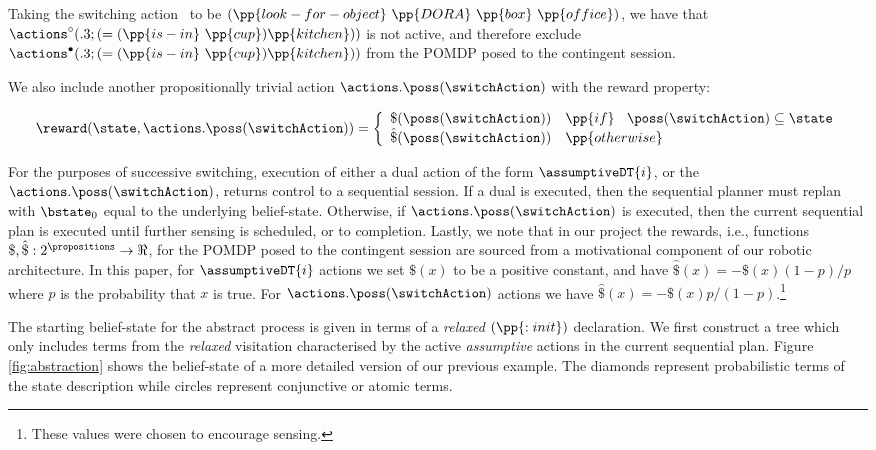 \noindent Taking the switching action \switchAction\ to be
$(\pp{look-for-object}~\pp{DORA}~\pp{box}~\pp{office})$, we have that
$\actions^{\circ}(.3;(=(\pp{is-in}~\pp{cup})\pp{kitchen}))$ is not
active, and therefore exclude
$\actions^{\bullet}(.3;(=(\pp{is-in}~\pp{cup})\pp{kitchen}))$ from the
POMDP posed to the contingent session. 

We also include another propositionally trivial action
$\actions.\poss(\switchAction)$ with the reward property:

\[
\reward(\state, \actions.\poss(\switchAction)) = \bigg\{ \begin{array}{ll}
\$(\poss(\switchAction)) & \pp{if}~\;\; \poss(\switchAction) \subseteq \state \\
\hat\$(\poss(\switchAction)) & \pp{otherwise} \\
\end{array}
\]

For the purposes of successive switching, execution of either a dual
action of the form $\assumptiveDT{i}$, or the
$\actions.\poss(\switchAction)$, returns control to a sequential
session. If a dual is executed, then the sequential planner must
replan with $\bstate_0$ equal to the underlying
belief-state. Otherwise, if $\actions.\poss(\switchAction)$ is
executed, then the current sequential plan is executed until further
sensing is scheduled, or to completion. Lastly, we note that in our
project the rewards, i.e., functions
$\$,\hat\$:2^\propositions\to\Re$, for the POMDP posed to the
contingent session are sourced from a motivational component of our
robotic architecture. In this paper, for $\assumptiveDT{i}$ actions
we set $\$(x)$ to be a positive constant, and have $\hat\$(x)= -
\$(x)(1 - p) / p$ where $p$ is the probability that $x$ is true. For
$\actions.\poss(\switchAction)$ actions we have $\hat\$(x)= -
\$(x)p/(1-p)$.\footnote{These values were chosen to encourage sensing.}


The starting belief-state for the abstract process is given in terms
of a {\em relaxed} $(\pp{:init})$ declaration. We first construct a
tree which only includes terms from the {\em relaxed} visitation
characterised by the active {\em assumptive} actions in the current
sequential plan. Figure \ref{fig:abstraction} shows the belief-state
of a more detailed version of our previous example. The diamonds
represent probabilistic terms of the state description while circles
represent conjunctive or atomic terms. 

